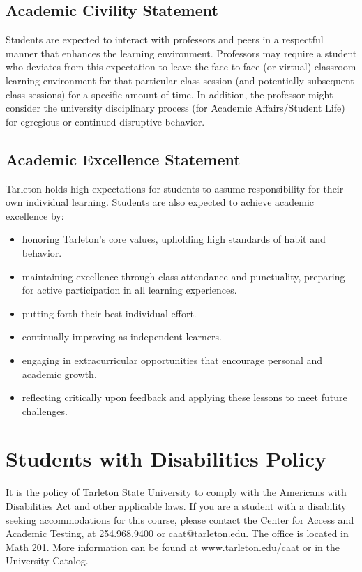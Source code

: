 \documentclass[10pt]{article}
\begin{document}
\subsection*{Academic Civility Statement}
\label{sec-9-2}
Students are expected to interact with professors and peers in a respectful manner that enhances the learning environment. Professors may require a student who deviates from this expectation to leave the face-to-face (or virtual) classroom learning environment for that particular class session (and potentially subsequent class sessions) for a specific amount of time. In addition, the professor might consider the university disciplinary process (for Academic Affairs/Student Life) for egregious or continued disruptive behavior.

\subsection*{Academic Excellence Statement}
\label{sec-9-3}
Tarleton holds high expectations for students to assume responsibility for their own individual learning. Students are also expected to achieve academic excellence by:
\begin{itemize}
\item honoring Tarleton’s core values, upholding high standards of habit and behavior.
\item maintaining excellence through class attendance and punctuality, preparing for active participation in all learning experiences.
\item putting forth their best individual effort.
\item continually improving as independent learners.
\item engaging in extracurricular opportunities that encourage personal and academic growth.
\item reflecting critically upon feedback and applying these lessons to meet future challenges.
\end{itemize}

\section*{Students with Disabilities Policy}
\label{sec-10}

It is the policy of Tarleton State University to comply with the Americans with Disabilities Act and other applicable laws. If you are a student with a disability seeking accommodations for this course, please contact the Center for Access and Academic Testing, at 254.968.9400 or caat@tarleton.edu. The office is located in Math 201. More information can be found at www.tarleton.edu/caat or in the University Catalog.
\end{document}
